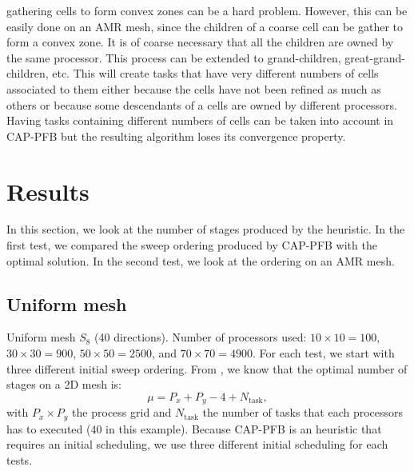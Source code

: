 \documentclass[letterpaper]{article}
\renewcommand{\(}{\left(}
\renewcommand{\)}{\right)}
\renewcommand{\[}{\left[}
\renewcommand{\]}{\right]}
\begin{document}
gathering cells to form convex zones can be a hard problem. However, this can be
easily done on an AMR mesh, since the children of a coarse cell can be gather to
form a convex zone. It is of coarse necessary that all the children are owned by
the same processor. This process can be extended to grand-children,
great-grand-children, etc. This will create tasks that have very different
numbers of cells associated to them either because the cells have not been
refined as much as others or because some descendants of a cells are owned by
different processors. Having tasks containing different numbers of cells can be
taken into account in CAP-PFB but the resulting algorithm loses its convergence
property. 


\section{Results}
In this section, we look at the number of stages produced by the heuristic. In
the first test, we compared the sweep ordering produced by CAP-PFB with the
optimal solution. In the second test, we look at the ordering on an AMR mesh.
\subsection{Uniform mesh}
Uniform mesh $S_8$ (40 directions). Number of processors used: $10\times10=100$, 
$30\times30=900$, $50\times50=2500$, and $70\times70=4900$. For each test, we 
start with three different initial sweep ordering. From \cite{Adams2013}, we know
that the optimal number of stages on a 2D mesh is:
\begin{equation}
  \mu = P_x + P_y - 4 + N_{\textrm{task}},
\end{equation}
with $P_x \times P_y$ the process grid and $N_{\textrm{task}}$ the number of
tasks that each processors has to executed (40 in this example). Because CAP-PFB
is an heuristic that requires an initial scheduling, we use three different
initial scheduling for each tests.
\end{document}
